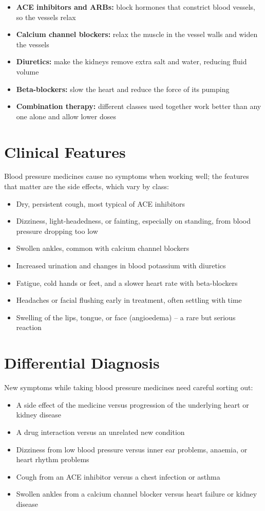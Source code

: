 \begin{itemize}
    \item \textbf{ACE inhibitors and ARBs:} block hormones that constrict blood vessels, so the vessels relax
    \item \textbf{Calcium channel blockers:} relax the muscle in the vessel walls and widen the vessels
    \item \textbf{Diuretics:} make the kidneys remove extra salt and water, reducing fluid volume
    \item \textbf{Beta-blockers:} slow the heart and reduce the force of its pumping
    \item \textbf{Combination therapy:} different classes used together work better than any one alone and allow lower doses
\end{itemize}

\section*{Clinical Features}
Blood pressure medicines cause no symptoms when working well; the features that matter are the side effects, which vary by class:

\begin{itemize}
    \item Dry, persistent cough, most typical of ACE inhibitors
    \item Dizziness, light-headedness, or fainting, especially on standing, from blood pressure dropping too low
    \item Swollen ankles, common with calcium channel blockers
    \item Increased urination and changes in blood potassium with diuretics
    \item Fatigue, cold hands or feet, and a slower heart rate with beta-blockers
    \item Headaches or facial flushing early in treatment, often settling with time
    \item Swelling of the lips, tongue, or face (angioedema) -- a rare but serious reaction
\end{itemize}

\section*{Differential Diagnosis}
New symptoms while taking blood pressure medicines need careful sorting out:

\begin{itemize}
    \item A side effect of the medicine versus progression of the underlying heart or kidney disease
    \item A drug interaction versus an unrelated new condition
    \item Dizziness from low blood pressure versus inner ear problems, anaemia, or heart rhythm problems
    \item Cough from an ACE inhibitor versus a chest infection or asthma
    \item Swollen ankles from a calcium channel blocker versus heart failure or kidney disease
\end{itemize}

